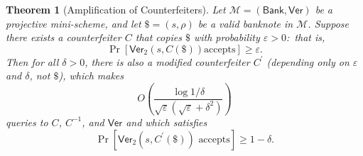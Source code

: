 \documentclass[10pt]{article}
\newtheorem{theorem}{Theorem}[section]
\theoremstyle{definition}
\numberwithin{equation}{section}
\begin{document}
\begin{theorem}
[Amplification of Counterfeiters]\label{miniamp}Let $\mathcal{M}=\left(
\mathsf{Bank},\mathsf{Ver}\right)  $ be a projective mini-scheme, and let
$\$=\left(  s,\rho\right)  $ be a valid banknote in $\mathcal{M}$. Suppose
there exists a counterfeiter $C$ that copies $\$$ with probability
$\varepsilon>0$:\ that is,%
\[
\Pr\left[  \mathsf{Ver}_{2}\left(  s,C\left(  \$\right)  \right)  \text{
accepts}\right]  \geq\varepsilon.
\]
Then for all $\delta>0$, there is also a modified counterfeiter $C^{\prime}$
(depending only on $\varepsilon$ and $\delta$, not $\$$), which makes%
\[
O\left(  \frac{\log1/\delta}{\sqrt{\varepsilon}\left(  \sqrt{\varepsilon
}+\delta^{2}\right)  }\right)
\]
queries to $C$, $C^{-1}$, and $\mathsf{Ver}$ and which satisfies%
\[
\Pr\left[  \mathsf{Ver}_{2}\left(  s,C^{\prime}\left(  \$\right)  \right)
\text{ accepts}\right]  \geq1-\delta.
\]

\end{theorem}
\end{document}
